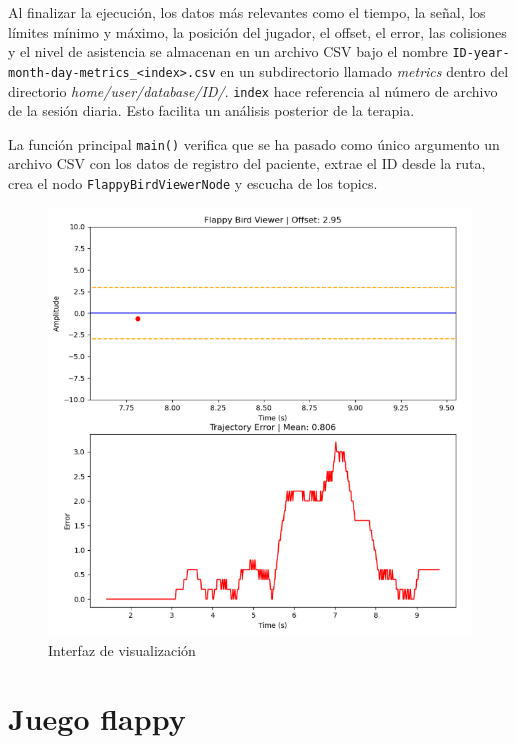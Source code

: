 Al finalizar la ejecución, los datos más relevantes como el tiempo, la señal, los límites mínimo y máximo, la posición del jugador, el offset, el error, las colisiones y el nivel de asistencia se almacenan en un archivo CSV bajo el nombre \verb|ID-year-month-day-metrics_<index>.csv| en un subdirectorio llamado \textit{metrics} dentro del directorio \textit{home/user/database/ID/}.
\verb|index| hace referencia al número de archivo de la sesión diaria.
Esto facilita un análisis posterior de la terapia.

La función principal \verb|main()| verifica que se ha pasado como único argumento un archivo CSV con los datos de registro del paciente, extrae el ID desde la ruta, crea el nodo \verb|FlappyBirdViewerNode| y escucha de los topics.

\begin{figure}[ht!]
	\centering
	\begin{minipage}{0.90\linewidth}
		\centering
		\includegraphics[width=\linewidth]{figs/visual2.png}
	\end{minipage}
	\caption[Interfaz de visualización]{Interfaz de visualización}
	\label{fig:visual}
\end{figure}

\section{Juego flappy}
\label{section:game}


